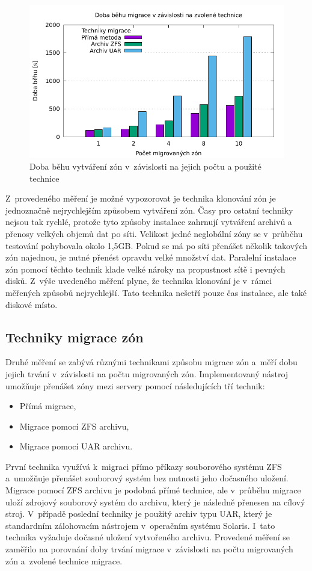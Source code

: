 \begin{figure}
  \centering
  \label{graph:measuremet:creation}
  \includegraphics{assets/pdfs/measurement_migration.pdf}
  \caption{Doba běhu vytváření zón v~závislosti na jejich počtu a použité technice}
\end{figure}

Z~provedeného měření je možné vypozorovat je technika klonování zón je jednoznačně nejrychlejším způsobem vytváření zón. Časy
pro ostatní techniky nejsou tak rychlé, protože tyto způsoby instalace zahrnují vytváření archivů a přenosy velkých objemů dat
po síti. Velikost jedné neglobální zóny se v~průběhu testování pohybovala okolo 1,5GB. Pokud se má po síti přenášet několik takových
zón najednou, je nutné přenést opravdu velké množství dat. Paralelní instalace zón pomocí těchto technik klade velké nároky na
propustnost sítě i pevných disků. Z~výše uvedeného měření plyne, že technika klonování je v~rámci měřených způsobů nejrychlejší.
Tato technika nešetří pouze čas instalace, ale také diskové místo.
\subsection{Techniky migrace zón}
\label{chapter:measurement:migration}
Druhé měření se zabývá různými technikami způsobu migrace zón a~měří dobu jejich trvání v~závislosti na počtu migrovaných zón.
Implementovaný nástroj umožňuje přenášet zóny mezi servery pomocí následujících tří technik:
\begin{itemize}
 \item Přímá migrace,
 \item Migrace pomocí ZFS archivu,
 \item Migrace pomocí UAR archivu.
\end{itemize}
První technika využívá k~migraci přímo příkazy souborového systému ZFS a~umožňuje přenášet souborový systém bez nutnosti jeho dočasného
uložení. Migrace pomocí ZFS archivu je podobná přímé technice, ale v~průběhu migrace uloží zdrojový souborový systém do archivu,
který je následně přenesen na cílový stroj. V~případě poslední techniky je použitý archiv typu UAR, který je standardním zálohovacím
nástrojem v~operačním systému Solaris. I~tato technika vyžaduje dočasné uložení vytvořeného archivu. Provedené měření se zaměřilo
na porovnání doby trvání migrace v~závislosti na počtu migrovaných zón a~zvolené technice migrace.

